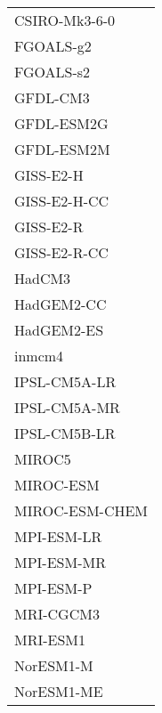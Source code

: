 \documentclass{ametsocV5}
\begin{document}
\begin{table}[t]
\begin{center}
\begin{tabular}{ l }
    CSIRO-Mk3-6-0   \\%
    FGOALS-g2       \\%
    FGOALS-s2       \\%
    GFDL-CM3        \\%
    GFDL-ESM2G      \\%
    GFDL-ESM2M      \\%
    GISS-E2-H       \\%
    GISS-E2-H-CC    \\%
    GISS-E2-R       \\%
    GISS-E2-R-CC    \\%
    HadCM3          \\%
    HadGEM2-CC      \\%
    HadGEM2-ES      \\%
    inmcm4          \\%
    IPSL-CM5A-LR    \\%
    IPSL-CM5A-MR    \\%
    IPSL-CM5B-LR    \\%
    MIROC5          \\%
    MIROC-ESM       \\%
    MIROC-ESM-CHEM  \\%
    MPI-ESM-LR      \\%
    MPI-ESM-MR      \\%
    MPI-ESM-P       \\%
    MRI-CGCM3       \\%
    MRI-ESM1        \\%
    NorESM1-M       \\%
    NorESM1-ME      \\%

  \end{tabular}
\end{center}
\end{table}
\end{document}
